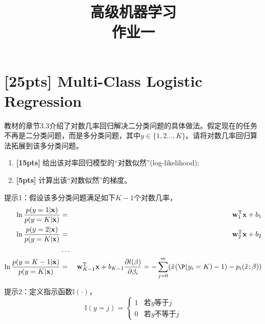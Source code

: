 \documentclass[a4paper,UTF8]{article}
\numberwithin{equation}{section}
\begin{document}
\title{高级机器学习\\
作业一}
\maketitle

\section{[25pts] Multi-Class Logistic Regression}
教材的章节3.3介绍了对数几率回归解决二分类问题的具体做法。假定现在的任务不再是二分类问题，而是多分类问题，其中$y\in\{1,2\dots,K\}$。请将对数几率回归算法拓展到该多分类问题。

\begin{enumerate}[(1)]
	\item \textbf{[15pts]} 给出该对率回归模型的“对数似然”(log-likelihood);
	\item \textbf{[5pts]} 计算出该“对数似然”的梯度。
\end{enumerate}

提示1：假设该多分类问题满足如下$K-1$个对数几率，
\begin{eqnarray*}
	\ln\frac{p(y=1|\mathbf{x})}{p(y=K|\mathbf{x})}&=&\mathbf{w}_1^\mathrm{T}\mathbf{x}+b_1\\
	\ln\frac{p(y=2|\mathbf{x})}{p(y=K|\mathbf{x})}&=&\mathbf{w}_2^\mathrm{T}\mathbf{x}+b_2\\
	&\dots&\\
	\ln\frac{p(y={K-1}|\mathbf{x})}{p(y=K|\mathbf{x})}&=&\mathbf{w}_{K-1}^\mathrm{T}\mathbf{x}+b_{K-1}
	\frac{ \partial l(\beta)}{\partial \beta_i} = - \sum^m_{j=0} (\hat{x}(\P(y_i = K)-1) -p_i(\hat{x};\beta))
\end{eqnarray*}

提示2：定义指示函数$\mathbb{I}(\cdot)$，
$$\mathbb{I}(y=j)=
\begin{cases}
1& \text{若$y$等于$j$}\\
0& \text{若$y$不等于$j$}
\end{cases}$$
\end{document}

